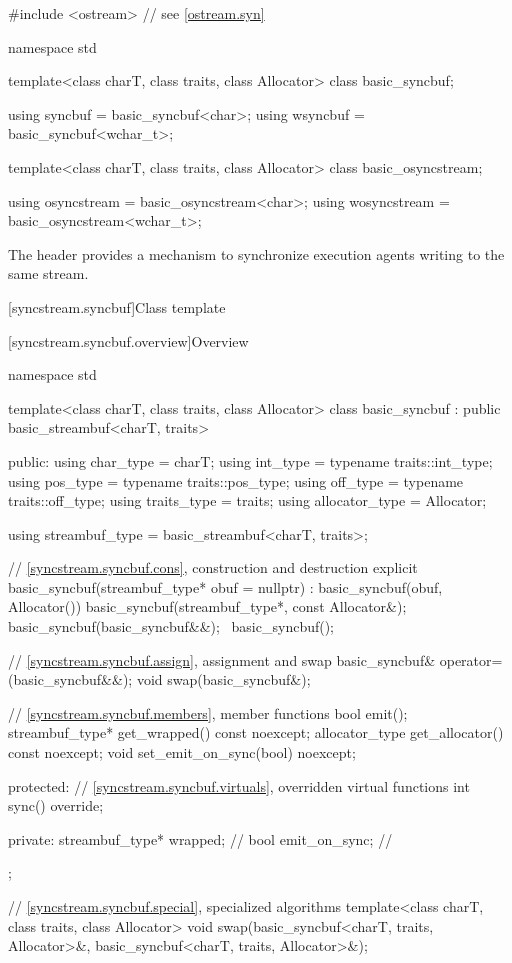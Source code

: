 %
%
%
%
\begin{codeblock}
#include <ostream>  // see \ref{ostream.syn}

namespace std {
  template<class charT, class traits, class Allocator>
    class basic_syncbuf;

  using syncbuf = basic_syncbuf<char>;
  using wsyncbuf = basic_syncbuf<wchar_t>;

  template<class charT, class traits, class Allocator>
    class basic_osyncstream;

  using osyncstream = basic_osyncstream<char>;
  using wosyncstream = basic_osyncstream<wchar_t>;
}
\end{codeblock}

\pnum
The header  provides a mechanism
to synchronize execution agents writing to the same stream.

[syncstream.syncbuf]{Class template }

[syncstream.syncbuf.overview]{Overview}

%
\begin{codeblock}
namespace std {
  template<class charT, class traits, class Allocator>
  class basic_syncbuf : public basic_streambuf<charT, traits> {
  public:
    using char_type      = charT;
    using int_type       = typename traits::int_type;
    using pos_type       = typename traits::pos_type;
    using off_type       = typename traits::off_type;
    using traits_type    = traits;
    using allocator_type = Allocator;

    using streambuf_type = basic_streambuf<charT, traits>;

    // \ref{syncstream.syncbuf.cons}, construction and destruction
    explicit basic_syncbuf(streambuf_type* obuf = nullptr)
      : basic_syncbuf(obuf, Allocator()) {}
    basic_syncbuf(streambuf_type*, const Allocator&);
    basic_syncbuf(basic_syncbuf&&);
    ~basic_syncbuf();

    // \ref{syncstream.syncbuf.assign}, assignment and swap
    basic_syncbuf& operator=(basic_syncbuf&&);
    void swap(basic_syncbuf&);

    // \ref{syncstream.syncbuf.members}, member functions
    bool emit();
    streambuf_type* get_wrapped() const noexcept;
    allocator_type get_allocator() const noexcept;
    void set_emit_on_sync(bool) noexcept;

  protected:
    // \ref{syncstream.syncbuf.virtuals}, overridden virtual functions
    int sync() override;

  private:
    streambuf_type* wrapped;    // \expos
    bool emit_on_sync{};        // \expos
  };

  // \ref{syncstream.syncbuf.special}, specialized algorithms
  template<class charT, class traits, class Allocator>
    void swap(basic_syncbuf<charT, traits, Allocator>&,
              basic_syncbuf<charT, traits, Allocator>&);
}
\end{codeblock}

